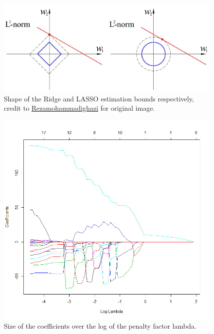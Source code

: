 \documentclass[a4paper,12pt]{article}
\begin{document}
\begin{figure}[H]
\centering
\begin{minipage}[]{0.75\textwidth}
  \includegraphics[width=\textwidth]{figures/L1_and_L2_balls.jpg}  
  \caption{Shape of the Ridge and LASSO estimation bounds respectively, credit to \href{https://en.wikipedia.org/wiki/File:L1_and_L2_balls.jpg}{Rezamohammadighazi} for original image.}
 \end{minipage}
\end{figure}

\begin{figure}[H]
\centering
\begin{minipage}[]{0.75\textwidth}
  \includegraphics[width=\textwidth]{figures/Lab2A2_coef_lasso.png}  
  \caption{Size of the coefficients over the log of the penalty factor lambda.}
 \end{minipage}
\end{figure}
\end{document}
